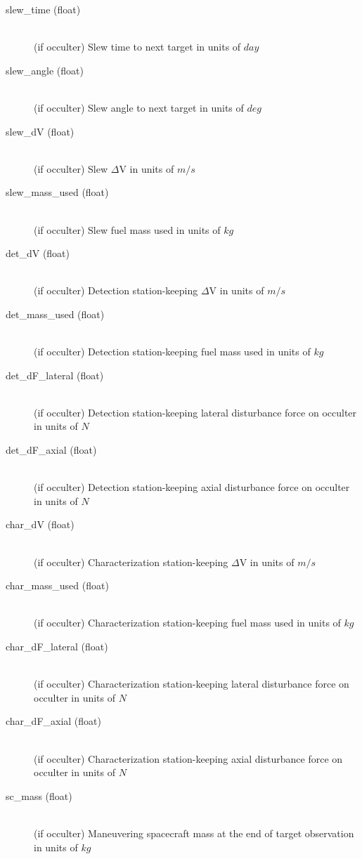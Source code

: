 \documentclass[cleanfoot]{asme2ej}
\begin{document}
\begin{itemize}
\begin{description}
\begin{description}
        \item[slew\_time (float)] \hfill \\ (if occulter) Slew time to next target in units of $ day $
        \item[slew\_angle (float)] \hfill \\ (if occulter) Slew angle to next target in units of $ deg $
        \item[slew\_dV (float)] \hfill \\ (if occulter) Slew $\Delta$V in units of $ m/s $
        \item[slew\_mass\_used (float)] \hfill \\ (if occulter) Slew fuel mass used in units of $ kg $
        \item[det\_dV (float)] \hfill \\ (if occulter) Detection station-keeping $\Delta$V in units of $ m/s $
        \item[det\_mass\_used (float)] \hfill \\ (if occulter) Detection station-keeping fuel mass used in units of $ kg $
        \item[det\_dF\_lateral (float)] \hfill \\ (if occulter) Detection station-keeping lateral disturbance force on occulter in units of $ N $
        \item[det\_dF\_axial (float)] \hfill \\ (if occulter) Detection station-keeping axial disturbance force on occulter in units of $ N $
        \item[char\_dV (float)] \hfill \\ (if occulter) Characterization station-keeping $\Delta$V in units of $ m/s $
        \item[char\_mass\_used (float)] \hfill \\ (if occulter) Characterization station-keeping fuel mass used in units of $ kg $
        \item[char\_dF\_lateral (float)] \hfill \\ (if occulter) Characterization station-keeping lateral disturbance force on occulter in units of $ N $
        \item[char\_dF\_axial (float)] \hfill \\ (if occulter) Characterization station-keeping axial disturbance force on occulter in units of $ N $
        \item[sc\_mass (float)] \hfill \\ (if occulter) Maneuvering spacecraft mass at the end of target observation in units of $kg$
    \end{description}
\end{description}
\end{itemize}
\end{document}
